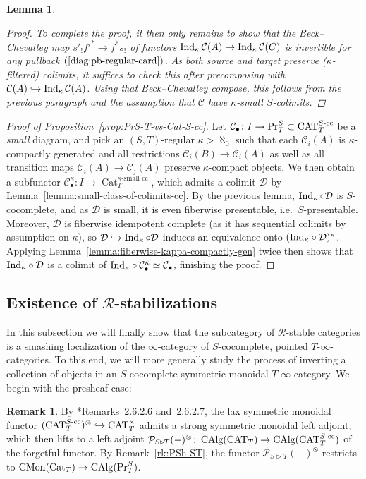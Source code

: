 \documentclass[reqno]{memo-l}
\theoremstyle{mythm}
\newtheorem{lemma}[thm]{Lemma}
\theoremstyle{definition}
\newtheorem{rk}[thm]{Remark}
\numberwithin{equation}{section}
\newcommand{\Cc}{{\mathcal{C}}}
\newcommand{\Dd}{{\mathcal{D}}}
\newcommand{\Rr}{{\mathcal R}}
\DeclareMathOperator{\Cat}{Cat}
\DeclareMathOperator{\CAT}{CAT}
\DeclareMathOperator{\CMon}{CMon}
\DeclareMathOperator{\CAlg}{\textup{CAlg}}
\renewcommand{\Pr}{\textup{Pr}}
\newcommand{\Ind}{\mathop{\textup{Ind}}\nolimits}
\begin{document}
\begin{lemma}
\begin{proof}
        To complete the proof, it then only remains to show that the Beck--Chevalley map $s'_!f'^*\to f^*s_!$ of functors $\Ind_\kappa\Cc(A)\to\Ind_\kappa\Cc(C)$ is invertible for any pullback $(\ref{diag:pb-regular-card})$. As both source and target preserve ($\kappa$-filtered) colimits, it suffices to check this after precomposing with $\Cc(A)\hookrightarrow\Ind_\kappa\Cc(A)$. Using that Beck--Chevalley compose, this follows from the previous paragraph and the assumption that $\Cc$ have $\kappa$-small $S$-colimits.
    \end{proof}
\end{lemma}

\begin{proof}[Proof of Proposition~\ref{prop:PrS-T-vs-Cat-S-cc}]
    Let $\Cc_\bullet\colon I\to\Pr^S_T\subset\CAT_T^\text{$S$-cc}$ be a \emph{small} diagram, and pick an $(S,T)$-regular $\kappa>\aleph_0$ such that each $\Cc_i(A)$ is $\kappa$-compactly generated and all restrictions $\Cc_i(B)\to\Cc_i(A)$ as well as all transition maps $\Cc_i(A)\to\Cc_j(A)$ preserve $\kappa$-compact objects. We then obtain a subfunctor $\Cc^\kappa_\bullet\colon I\to\Cat_T^\text{$\kappa$-small cc}$, which admits a colimit $\Dd$ by Lemma~\ref{lemma:small-class-of-colimits-cc}. By the previous lemma, $\Ind_\kappa\circ\Dd$ is $S$-cocomplete, and as $\Dd$ is small, it is even fiberwise presentable, i.e.\ $S$-presentable. Moreover, $\Dd$ is fiberwise idempotent complete (as it has sequential colimits by assumption on $\kappa$), so $\Dd\hookrightarrow\Ind_\kappa\circ\Dd$ induces an equivalence onto $({\Ind_\kappa}\circ\Dd)^\kappa$. Applying Lemma~\ref{lemma:fiberwise-kappa-compactly-gen} twice then shows that ${\Ind_\kappa}\circ\Dd$ is a colimit of ${\Ind_\kappa}\circ\Cc_\bullet^\kappa\simeq\Cc_\bullet$, finishing the proof.
\end{proof}

\subsection{Existence of $\bm{\mathcal R}$-stabilizations}\label{subsec:invert-objects} In this subsection we will finally show that the subcategory of $\Rr$-stable categories is a smashing localization of the $\infty$-category of $S$-cocomplete, pointed $T$-$\infty$-categories. 
To this end, we will more generally study the process of inverting a collection of objects in an $S$-cocomplete symmetric monoidal $T$-$\infty$-category. We begin with the presheaf case:

\begin{rk}\label{rk:sym-mon-cocompletion}
    By \cite{martiniwolf2022presentable}*{Remarks~2.6.2.6 and~2.6.2.7}, the lax symmetric monoidal functor $(\CAT_T^\textup{$S$-cc})^\otimes\hookrightarrow\CAT_T^\times$ admits a strong symmetric monoidal left adjoint, which then lifts to a left adjoint $\mathcal P_{S\triangleright T}(-)^{\otimes}\colon\CAlg(\CAT_T)\to\CAlg(\CAT_T^\text{$S$-cc})$ of the forgetful functor. 
    By Remark~\ref{rk:PSh-ST}, the functor $\mathcal P_{S\triangleright T}(-)^{\otimes}$ restricts to $\CMon(\Cat_T)\to\CAlg(\Pr^S_T)$.
\end{rk}
\end{document}
